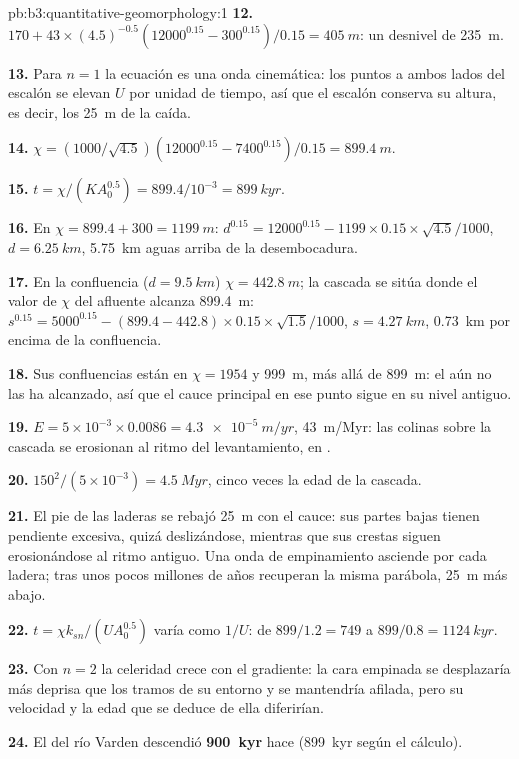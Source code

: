 \begin{solution}{pb:b3:quantitative-geomorphology:1}
\textbf{12.} $170 + 43\times(4.5)^{-0.5}(12000^{0.15} - 300^{0.15})/0.15 =
\qty{405}{m}$: un desnivel de \qty{235}{m}.

\textbf{13.} Para $n = 1$ la ecuación es una onda cinemática: los puntos a ambos
lados del escalón se elevan $U$ por unidad de tiempo, así que el escalón conserva su altura,
es decir, los \qty{25}{m} de la caída.

\textbf{14.} $\chi = (1000/\sqrt{4.5})(12000^{0.15} - 7400^{0.15})/0.15 =
\qty{899.4}{m}$.

\textbf{15.} $t = \chi/(KA_0^{0.5}) = 899.4/10^{-3} = \qty{899}{kyr}$.

\textbf{16.} En $\chi = 899.4 + 300 = \qty{1199}{m}$:
$d^{0.15} = 12000^{0.15} - 1199\times0.15\times\sqrt{4.5}/1000$, $d =
\qty{6.25}{km}$, \qty{5.75}{km} aguas arriba de la desembocadura.

\textbf{17.} En la confluencia ($d = \qty{9.5}{km}$) $\chi = \qty{442.8}{m}$;
la cascada se sitúa donde el valor de $\chi$ del afluente alcanza \qty{899.4}{m}:
$s^{0.15} = 5000^{0.15} - (899.4 - 442.8)\times0.15\times\sqrt{1.5}/1000$,
$s = \qty{4.27}{km}$, \qty{0.73}{km} por encima de la confluencia.

\textbf{18.} Sus confluencias están en $\chi = 1954$ y \qty{999}{m}, más allá de
\qty{899}{m}: el  aún no las ha alcanzado, así que el cauce principal en ese punto sigue
en su nivel antiguo.

\textbf{19.} $E = 5\times10^{-3}\times0.0086 = \qty{4.3e-5}{m/yr}$,
\qty{43}{m/Myr}: las colinas sobre la cascada se erosionan al ritmo del levantamiento, en
.

\textbf{20.} $150^2/(5\times10^{-3}) = \qty{4.5}{Myr}$, cinco veces la edad de
la cascada.

\textbf{21.} El pie de las laderas se rebajó \qty{25}{m} con el cauce: sus
partes bajas tienen pendiente excesiva, quizá deslizándose, mientras que sus crestas siguen
erosionándose al ritmo antiguo. Una onda de empinamiento asciende por cada ladera; tras unos pocos
millones de años recuperan la misma parábola, \qty{25}{m} más abajo.

\textbf{22.} $t = \chi k_{sn}/(U A_0^{0.5})$ varía como $1/U$: de
$899/1.2 = 749$ a $899/0.8 = \qty{1124}{kyr}$.

\textbf{23.} Con $n = 2$ la celeridad crece con el gradiente: la cara empinada
se desplazaría más deprisa que los tramos de su entorno y se mantendría afilada, pero
su velocidad y la edad que se deduce de ella diferirían.

\textbf{24.} El  del río Varden descendió
\textbf{\qty[text-series-to-math=true]{900}{kyr}} hace (\qty{899}{kyr} según el
cálculo).
\end{solution}

